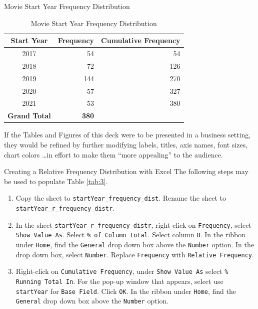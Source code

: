 \documentclass[pdf]{beamer}
\theoremstyle{remark}
\theoremstyle{definition}
\begin{document}
\begin{frame}{Movie Start Year Frequency Distribution}
\begin{table}[htbp]
  \centering
  \captionsetup{justification=centering}
    \begin{tabular}{crr}
    \rowcolor[rgb]{ .851,  .882,  .949} \textbf{Start Year} & \multicolumn{1}{l}{\textbf{Frequency}} & \multicolumn{1}{l}{\textbf{Cumulative Frequency}}\\
    \midrule
    2017  & 54 &54\\
    2018  & 72 &126\\
    2019  & 144 &270\\
    2020  & 57 &327\\
    2021  & 53 &380\\
    \midrule
    \rowcolor[rgb]{ .851,  .882,  .949} \textbf{Grand Total} & \textbf{380} & \\
    \end{tabular}%
    \caption{Movie Start Year Frequency Distribution}
  \label{tab:syfd}%
\end{table}%

If the Tables and Figures of this deck were to be presented in a business setting, they would be refined by further modifying labels, titles, axis names, font sizes, chart colors \ldots in effort to make them ``more appealing'' to the audience.
\end{frame}

\begin{frame}[t]{Creating a Relative Frequency Distribution with Excel}
The following steps may be used to populate Table \ref{tab:3}.\\   
\vspace{1.5ex}
\begin{enumerate}
\item Copy the sheet to \texttt{startYear\_frequency\_dist}.  Rename the sheet to \texttt{startYear\_r\_frequency\_distr}.
\item In the sheet \texttt{startYear\_r\_frequency\_distr}, right-click on \texttt{Frequency}, select \texttt{Show Value As}. Select \texttt{\% of Column Total}.  Select column \texttt{B}. In the ribbon under \texttt{Home}, find the \texttt{General} drop down box above the \texttt{Number} option.  In the drop down box, select \texttt{Number}. Replace \texttt{Frequency} with \texttt{Relative Frequency}.
\item Right-click on \texttt{Cumulative Frequency}, under \texttt{Show Value As} select \texttt{\%  Running Total In}.  For the pop-up window that appears, select use \texttt{startYear} for \texttt{Base Field}.  Click \texttt{OK}.  In the ribbon under \texttt{Home}, find the \texttt{General} drop down box above the \texttt{Number} option.  
\end{enumerate}
\normalsize
\end{frame}
\end{document}
